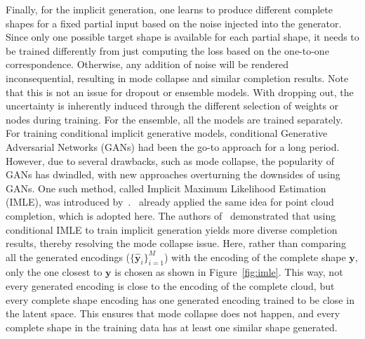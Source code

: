         Finally, for the implicit generation, one learns to produce different complete shapes for a fixed partial input based on the noise injected into the generator. Since only one possible target shape is available for each partial shape, it needs to be trained differently from just computing the loss based on the one-to-one correspondence. Otherwise, any addition of noise will be rendered inconsequential, resulting in mode collapse and similar completion results. Note that this is not an issue for dropout or ensemble models. With dropping out, the uncertainty is inherently induced through the different selection of weights or nodes during training. For the ensemble, all the models are trained separately. 
        \\
        For training conditional implicit generative models, conditional Generative Adversarial Networks (GANs) had been the go-to approach for a long period. However, due to several drawbacks, such as mode collapse, the popularity of GANs has dwindled, with new approaches overturning the downsides of using GANs. One such method, called Implicit Maximum Likelihood Estimation (IMLE), was introduced by~\cite{IMLE}.~\cite{PCCIMLE} already applied the same idea for point cloud completion, which is adopted here. The authors of~\cite{PCCIMLE} demonstrated that using conditional IMLE to train implicit generation yields more diverse completion results, thereby resolving the mode collapse issue. Here, rather than comparing all the generated encodings ($\{\mathbf{\hat{y}}_i\}_{i=1}^M$) with the encoding of the complete shape $\mathbf{y}$, only the one closest to $\mathbf{y}$ is chosen as shown in Figure~\ref{fig:imle}. This way, not every generated encoding is close to the encoding of the complete cloud, but every complete shape encoding has one generated encoding trained to be close in the latent space. This ensures that mode collapse does not happen, and every complete shape in the training data has at least one similar shape generated.

